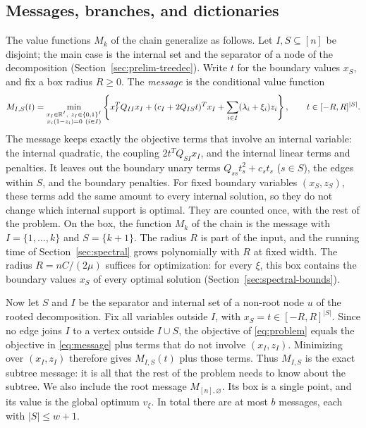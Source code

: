 \subsection{Messages, branches, and dictionaries}
\label{sec:prelim-messages}
The value functions $M_k$ of the chain generalize as follows. Let
$I,S\subseteq[n]$ be disjoint; the main case is the internal set and the
separator of a node of the decomposition
(Section~\ref{sec:prelim-treedec}). Write $t$ for the boundary values
$x_S$, and fix a box radius $R\ge0$. The \emph{message} is the
conditional value function
\begin{equation}\label{eq:message}
 M_{I,S}(t)=\min_{\substack{x_I\in\mathbb R^I,\ z_I\in\{0,1\}^I\\
                     x_i(1-z_i)=0\ (i\in I)}}
 \left\{x_I^TQ_{II}x_I+(c_I+2Q_{IS}t)^Tx_I
           +\sum_{i\in I}(\lambda_i+\xi_i)z_i\right\},
 \qquad t\in[-R,R]^{|S|}.
\end{equation}
The message keeps exactly the objective terms that involve an internal
variable: the internal quadratic, the coupling $2t^TQ_{SI}x_I$, and the
internal linear terms and penalties. It leaves out the boundary unary
terms $Q_{ss}t_s^2+c_st_s$ ($s\in S$), the edges within $S$, and the
boundary penalties. For fixed boundary variables $(x_S,z_S)$, these terms
add the same amount to every internal solution, so they do not change
which internal support is optimal. They are counted once, with the rest
of the problem. On the box, the function $M_k$ of the chain is the message
with $I=\{1,\ldots,k\}$ and $S=\{k+1\}$. The radius $R$ is part of the
input, and the running time of Section~\ref{sec:spectral} grows
polynomially with $R$ at fixed width. The radius $R=nC/(2\mu)$ suffices
for optimization: for every $\xi$, this box contains the boundary values
$x_S$ of every optimal solution (Section~\ref{sec:spectral-bounds}).

Now let $S$ and $I$ be the separator and internal set of a non-root node
$u$ of the rooted decomposition. Fix all variables outside $I$, with
$x_S=t\in[-R,R]^{|S|}$. Since no edge joins $I$ to a vertex outside
$I\cup S$, the objective of \eqref{eq:problem} equals the objective in
\eqref{eq:message} plus terms that do not involve $(x_I,z_I)$. Minimizing
over $(x_I,z_I)$ therefore gives $M_{I,S}(t)$ plus those terms. Thus
$M_{I,S}$ is the exact subtree message: it is all that the rest of the
problem needs to know about the subtree. We also include the root
message $M_{[n],\varnothing}$. Its box is a single point, and its value
is the global optimum $v_\xi$. In total there are at most $b$ messages,
each with $|S|\le w+1$.

